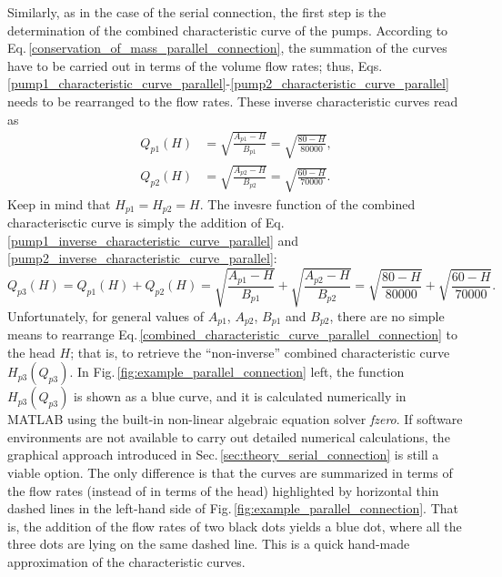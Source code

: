 Similarly, as in the case of the serial connection, the first step is the determination of the combined characteristic curve of the pumps. According to Eq.\,\eqref{conservation_of_mass_parallel_connection}, the summation of the curves have to be carried out in terms of the volume flow rates; thus, Eqs.\,\eqref{pump1_characteristic_curve_parallel}-\eqref{pump2_characteristic_curve_parallel} needs to be rearranged to the flow rates. These inverse characteristic curves read as
%
\begin{align}
Q_{p1}(H) &= \sqrt{ \frac{A_{p1}-H}{B_{p1}} } = \sqrt{ \frac{80-H}{80000} }, \label{pump1_inverse_characteristic_curve_parallel} \\
Q_{p2}(H) &= \sqrt{ \frac{A_{p2}-H}{B_{p2}} } = \sqrt{ \frac{60-H}{70000} }. \label{pump2_inverse_characteristic_curve_parallel}
\end{align}
%
Keep in mind that $H_{p1}=H_{p2}=H$. The invesre function of the combined characterisctic curve is simply the addition of Eq.\,\eqref{pump1_inverse_characteristic_curve_parallel} and \eqref{pump2_inverse_characteristic_curve_parallel}:
%
\begin{equation} \label{combined_characteristic_curve_parallel_connection}
Q_{p3}(H) = Q_{p1}(H) + Q_{p2}(H) = \sqrt{ \frac{A_{p1}-H}{B_{p1}} } + \sqrt{ \frac{A_{p2}-H}{B_{p2}} } = \sqrt{ \frac{80-H}{80000} } + \sqrt{ \frac{60-H}{70000} }.
\end{equation}
%
Unfortunately, for general values of $A_{p1}$, $A_{p2}$, $B_{p1}$ and $B_{p2}$, there are no simple means to rearrange Eq.\,\eqref{combined_characteristic_curve_parallel_connection} to the head $H$; that is, to retrieve the ``non-inverse'' combined characteristic curve $H_{p3}(Q_{p3})$. In Fig.\,\ref{fig:example_parallel_connection} left, the function $H_{p3}(Q_{p3})$ is shown as a blue curve, and it is calculated numerically in MATLAB using the built-in non-linear algebraic equation solver \textit{fzero}. If software environments are not available to carry out detailed numerical calculations, the graphical approach introduced in Sec.\,\ref{sec:theory_serial_connection} is still a viable option. The only difference is that the curves are summarized in terms of the flow rates (instead of in terms of the head) highlighted by horizontal thin dashed lines in the left-hand side of Fig.\,\ref{fig:example_parallel_connection}. That is, the addition of the flow rates of two black dots yields a blue dot, where all the three dots are lying on the same dashed line. This is a quick hand-made approximation of the characteristic curves.

